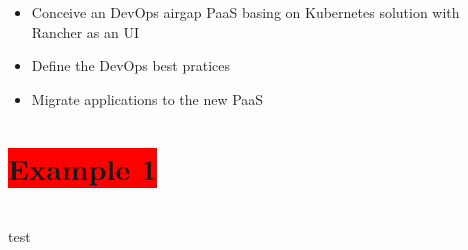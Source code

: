 \documentclass[10pt,A4]{article}
\begin{document}
\begin{minipage}[c]{0.7\textwidth}
\begin{itemize}
  \item Conceive an DevOps airgap PaaS basing on Kubernetes solution with Rancher as an UI
  \item Define the DevOps best pratices
  \item Migrate applications to the new PaaS
\end{itemize}

\section*{\colorbox{red}{Example 1}}
\section*{\noindent\colorbox{cyan}{}}

{\noindent\colorbox{cyan}{}}

test

{\noindent\hspace*{\dimexpr-\oddsidemargin-1in\relax}%
 \colorbox{cyan}{}%
 \hspace*{-\paperwidth}}
\end{minipage}
\begin{minipage}[t]{0.05\textwidth}
\end{minipage}
\end{document}
